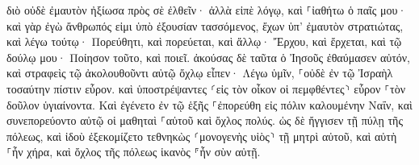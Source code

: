\documentclass{openreader}
\begin{document}
διὸ οὐδὲ ἐμαυτὸν ἠξίωσα πρὸς σὲ ἐλθεῖν· ἀλλὰ εἰπὲ λόγῳ, καὶ ⸀ἰαθήτω ὁ παῖς μου· 
καὶ γὰρ ἐγὼ ἄνθρωπός εἰμι ὑπὸ ἐξουσίαν τασσόμενος, ἔχων ὑπ’ ἐμαυτὸν στρατιώτας, καὶ λέγω τούτῳ· Πορεύθητι, καὶ πορεύεται, καὶ ἄλλῳ· Ἔρχου, καὶ ἔρχεται, καὶ τῷ δούλῳ μου· Ποίησον τοῦτο, καὶ ποιεῖ. 
ἀκούσας δὲ ταῦτα ὁ Ἰησοῦς ἐθαύμασεν αὐτόν, καὶ στραφεὶς τῷ ἀκολουθοῦντι αὐτῷ ὄχλῳ εἶπεν· Λέγω ὑμῖν, ⸀οὐδὲ ἐν τῷ Ἰσραὴλ τοσαύτην πίστιν εὗρον. 
καὶ ὑποστρέψαντες ⸂εἰς τὸν οἶκον οἱ πεμφθέντες⸃ εὗρον ⸀τὸν δοῦλον ὑγιαίνοντα. 
Καὶ ἐγένετο ἐν τῷ ἑξῆς ⸀ἐπορεύθη εἰς πόλιν καλουμένην Ναΐν, καὶ συνεπορεύοντο αὐτῷ οἱ μαθηταὶ ⸀αὐτοῦ καὶ ὄχλος πολύς. 
ὡς δὲ ἤγγισεν τῇ πύλῃ τῆς πόλεως, καὶ ἰδοὺ ἐξεκομίζετο τεθνηκὼς ⸂μονογενὴς υἱὸς⸃ τῇ μητρὶ αὐτοῦ, καὶ αὐτὴ ⸀ἦν χήρα, καὶ ὄχλος τῆς πόλεως ἱκανὸς ⸁ἦν σὺν αὐτῇ. 
\end{document}
